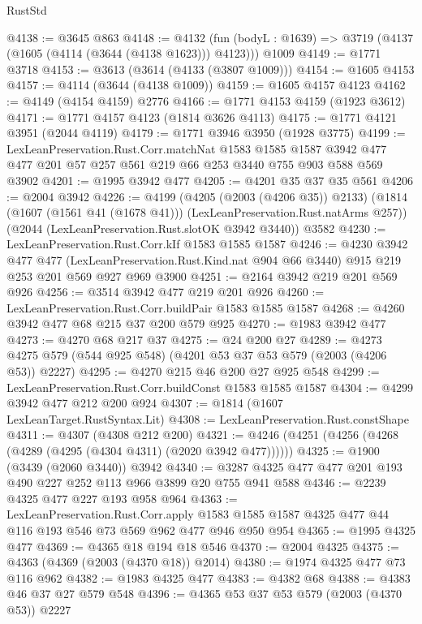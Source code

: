 \begin{lexlean}{RustStd}
\begin{coremodule}
@4138 := @3645 @863
@4148 := @4132
    (fun (bodyL : @1639) => @3719 (@4137 (@1605 (@4114 (@3644 (@4138 @1623))) @4123)))
    @1009
@4149 := @1771 @3718
@4153 := @3613 (@3614 (@4133 (@3807 @1009)))
@4154 := @1605 @4153
@4157 := @4114 (@3644 (@4138 @1009))
@4159 := @1605 @4157 @4123
@4162 := @4149 (@4154 @4159) @2776
@4166 := @1771 @4153 @4159 (@1923 @3612)
@4171 := @1771 @4157 @4123 (@1814 @3626 @4113)
@4175 := @1771 @4121 @3951 (@2044 @4119)
@4179 := @1771 @3946 @3950 (@1928 @3775)
@4199 := LexLeanPreservation.Rust.Corr.matchNat
    @1583
    @1585
    @1587
    @3942
    @477
    @477
    @201
    @57
    @257
    @561
    @219
    @66
    @253
    @3440
    @755
    @903
    @588
    @569
    @3902
@4201 := @1995 @3942 @477
@4205 := @4201 @35 @37 @35 @561
@4206 := @2004 @3942
@4226 := @4199
    (@4205 (@2003 (@4206 @35)) @2133)
    (@1814 (@1607 (@1561 @41 (@1678 @41))) (LexLeanPreservation.Rust.natArms @257))
    (@2044 (LexLeanPreservation.Rust.slotOK @3942 @3440))
    @3582
@4230 := LexLeanPreservation.Rust.Corr.kIf @1583 @1585 @1587
@4246 := @4230
    @3942
    @477
    @477
    (LexLeanPreservation.Rust.Kind.nat @904 @66 @3440)
    @915
    @219
    @253
    @201
    @569
    @927
    @969
    @3900
@4251 := @2164 @3942 @219 @201 @569 @926
@4256 := @3514 @3942 @477 @219 @201 @926
@4260 := LexLeanPreservation.Rust.Corr.buildPair @1583 @1585 @1587
@4268 := @4260 @3942 @477 @68 @215 @37 @200 @579 @925
@4270 := @1983 @3942 @477
@4273 := @4270 @68 @217 @37
@4275 := @24 @200 @27
@4289 := @4273 @4275 @579 (@544 @925 @548) (@4201 @53 @37 @53 @579 (@2003 (@4206 @53)) @2227)
@4295 := @4270 @215 @46 @200 @27 @925 @548
@4299 := LexLeanPreservation.Rust.Corr.buildConst @1583 @1585 @1587
@4304 := @4299 @3942 @477 @212 @200 @924
@4307 := @1814 (@1607 LexLeanTarget.RustSyntax.Lit)
@4308 := LexLeanPreservation.Rust.constShape
@4311 := @4307 (@4308 @212 @200)
@4321 := @4246 (@4251 (@4256 (@4268 (@4289 (@4295 (@4304 @4311) (@2020 @3942 @477))))))
@4325 := @1900 (@3439 (@2060 @3440)) @3942
@4340 := @3287 @4325 @477 @477 @201 @193 @490 @227 @252 @113 @966 @3899 @20 @755 @941 @588
@4346 := @2239 @4325 @477 @227 @193 @958 @964
@4363 := LexLeanPreservation.Rust.Corr.apply
    @1583
    @1585
    @1587
    @4325
    @477
    @44
    @116
    @193
    @546
    @73
    @569
    @962
    @477
    @946
    @950
    @954
@4365 := @1995 @4325 @477
@4369 := @4365 @18 @194 @18 @546
@4370 := @2004 @4325
@4375 := @4363 (@4369 (@2003 (@4370 @18)) @2014)
@4380 := @1974 @4325 @477 @73 @116 @962
@4382 := @1983 @4325 @477
@4383 := @4382 @68
@4388 := @4383 @46 @37 @27 @579 @548
@4396 := @4365 @53 @37 @53 @579 (@2003 (@4370 @53)) @2227

\end{coremodule}
\end{lexlean}
